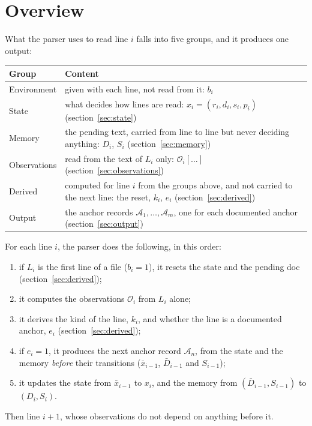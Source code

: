 \documentclass[11pt]{article}
\begin{document}
\section{Overview}
\label{sec:overview}

What the parser uses to read line $i$ falls into five groups, and it produces one output:

\begin{center}
\begin{tabular}{@{}lP{0.66\textwidth}@{}}
  \toprule
  Group & Content \\
  \midrule
  Environment & given with each line, not read from it: $b_i$ \\
  State & what decides how lines are read: $x_i = (r_i, d_i, s_i, p_i)$
          (section~\ref{sec:state}) \\
  Memory & the pending text, carried from line to line but never deciding anything:
           $D_i$, $S_i$ (section~\ref{sec:memory}) \\
  Observations & read from the text of $L_i$ only: $\mathcal{O}_i[\ldots]$
                 (section~\ref{sec:observations}) \\
  Derived & computed for line $i$ from the groups above, and not carried to the next line:
            the reset, $k_i$, $e_i$ (section~\ref{sec:derived}) \\
  \midrule
  Output & the anchor records $\mathcal{A}_1, \dots, \mathcal{A}_m$, one for each
           documented anchor (section~\ref{sec:output}) \\
  \bottomrule
\end{tabular}
\end{center}

\noindent For each line $i$, the parser does the following, in this order:
\begin{enumerate}
  \item if $L_i$ is the first line of a file ($b_i = 1$), it resets the state and the
        pending doc (section~\ref{sec:derived});
  \item it computes the observations $\mathcal{O}_i$ from $L_i$ alone;
  \item it derives the kind of the line, $k_i$, and whether the line is a documented anchor,
        $e_i$ (section~\ref{sec:derived});
  \item if $e_i = 1$, it produces the next anchor record $\mathcal{A}_n$, from the state
        and the memory \emph{before} their transitions ($\bar x_{i-1}$, $\bar D_{i-1}$ and
        $S_{i-1}$);
  \item it updates the state from $\bar x_{i-1}$ to $x_i$, and the memory from
        $(\bar D_{i-1}, S_{i-1})$ to $(D_i, S_i)$.
\end{enumerate}
Then line $i+1$, whose observations do not depend on anything before it.
\end{document}

